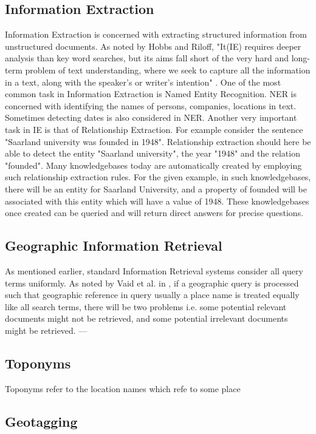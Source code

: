 \documentclass[
     11pt,         %
     a4paper,      %
     oneside,
     ]{article}
\begin{document}
\subsection{Information Extraction}
Information Extraction is concerned with extracting structured information from unstructured documents. As noted by Hobbs and Riloff, "It(IE) requires deeper analysis than  key word searches, but its aims fall short of the very hard and long-term problem of text understanding, where we seek to capture all the information in a text, along with the speaker's or writer's intention" \cite{hobbs-handbook10}.
One of the most common task in Information Extraction is Named Entity Recognition. NER is concerned with identifying the names of persons, companies, locations in text. Sometimes detecting dates is also considered in NER. Another very important task in IE is that of Relationship Extraction. For example consider the sentence "Saarland university was founded in 1948". Relationship extraction should here be able to detect the entity "Saarland university", the year "1948" and the relation "founded". Many knowledgebases today are automatically created by employing such relationship extraction rules. For the given example, in such knowledgebases, there will be an entity for Saarland University, and a property of founded will be associated with this entity which will have a value of 1948. These knowledgebases once created can be queried and will return direct answers for precise questions.
\subsection{Geographic Information Retrieval}
As mentioned earlier, standard Information Retrieval systems consider all query terms uniformly. As noted by Vaid et al. in \cite{Vaid:2005:SIG:2156226.2156244}, if a geographic query is processed such that geographic reference in query usually a place name is treated equally like all search terms, there will be two problems i.e. some potential relevant documents might not be retrieved, and some potential irrelevant documents might be retrieved. ---

\subsection{Toponyms} Toponyms refer to the location names which refe to some place
\subsection{Geotagging}
\end{document}
